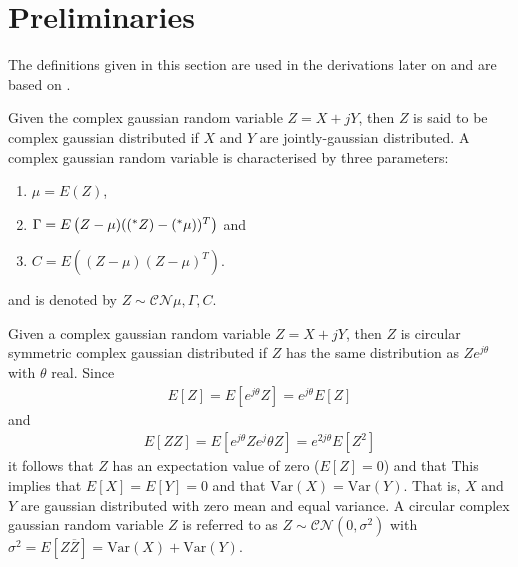 \documentclass[a4paper, openany, oneside]{memoir}
\begin{document}
\section{Preliminaries}
The definitions given in this section are used in the derivations later on and are based  on \cite{yates2005probability}.

\begin{blockDefinition}
Given the complex gaussian random variable $Z = X + jY$, then $Z$ is said to be complex gaussian distributed if $X$ and $Y$ are jointly-gaussian distributed. A complex gaussian random variable is characterised by three parameters:
\begin{enumerate}
	\item $\mu = E(Z)$,
	\item $\Gamma = E\left(Z-\mu)((^*Z)-(^*\mu))^T\right)$ and
	\item $C = E\left((Z-\mu)(Z-\mu)^T\right)$.
\end{enumerate}
and is denoted by $Z \sim \mathcal{CN}{\mu, \Gamma, C}$.
\end{blockDefinition}

\begin{blockDefinition}
Given a complex gaussian random variable $Z = X + jY$, then $Z$ is circular symmetric complex gaussian distributed if $Z$ has the same distribution as $Ze^{j\theta}$ with $\theta$ real. Since
\begin{align*}
	E\left[Z\right] = E\left[e^{j\theta}Z\right]  = e^{j\theta}E\left[Z\right] 
\end{align*}
and
\begin{align*}
	E\left[ZZ\right] = E\left[e^{j\theta}Z e^j\theta{Z}\right]  = e^{2j\theta}E\left[Z^2\right] 
\end{align*}
it follows that $Z$  has an expectation value of zero ($E\left[Z\right] = 0$) and that %
This implies that $E\left[X\right] = E\left[Y\right] = 0$ and that $\text{Var}\left(X\right) = \text{Var}\left(Y\right)$. That is, $X$ and $Y$ are gaussian distributed
with zero mean and equal variance. 
A circular complex gaussian random variable $Z$ is referred to as $Z \sim \mathcal{CN}(0,\sigma^2)$ with $\sigma^2= E\left[Z\overline{Z}\right] = \text{Var}\left(X\right) + \text{Var}\left(Y\right)$. 
\end{blockDefinition}
\end{document}
